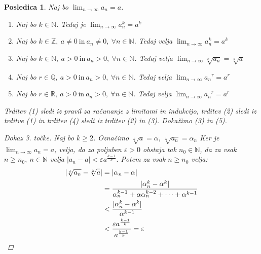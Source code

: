 \documentclass[10pt, a4paper]{article}
\newtheorem{posledica}[izr]{Posledica}
\newenvironment{noticeC}{%
  \tcolorbox[%
  notitle,
  empty,
  enhanced,  %
  breakable,
  coltext=black, 
  fontupper=\rmfamily,
  noparskip,
  sharp corners,
  boxrule=-1pt,  %
  frame hidden,
  left=7pt,  %
  right=7pt,
  top=5pt,
  bottom=5pt,
  before skip=2.5ex plus 2pt,
  after skip=2.5ex plus 2pt,
  overlay unbroken and last={%
  },
  ]}
{\endtcolorbox}
\newenvironment{dokaz}%
  {\begin{noticeC}\begin{proof}}%
  {\end{proof}\end{noticeC}}
\newcommand{\N}{\mathbb {N}}
\newcommand{\Z}{\mathbb {Z}}
\newcommand{\Q}{\mathbb {Q}}
\newcommand{\R}{\mathbb {R}}
\newcommand{\limzap}[1]{\lim_{n \to \infty} {#1}}
\begin{document}
\begin{posledica}
    Naj bo $\limzap{a_n} = a$.

    \begin{enumerate}
        \item Naj bo $k \in \N$. Tedaj je $\limzap{a_n^k} = a^k$
        \item Naj bo $k \in \Z,\ a\neq 0\ \text{in}\ a_n \neq 0,\ \forall n\in \N$. Tedaj velja $\limzap{a_n^k} = a^k$
        \item Naj bo $k \in \N,\ a > 0\ \text{in}\ a_n > 0,\ \forall n\in \N$. Tedaj velja $\limzap{\sqrt[k]{a_n}} = \sqrt[k]{a}$
        \item Naj bo $r \in \Q,\ a > 0\ \text{in}\ a_n > 0,\ \forall n\in \N$. Tedaj velja $\limzap{{a_n}^r} = a^r$
        \item Naj bo $r \in \R,\ a > 0\ \text{in}\ a_n > 0,\ \forall n\in \N$. Tedaj velja $\limzap{{a_n}^r} = a^r$
    \end{enumerate}

    Trditev (1) sledi iz pravil za računanje z limitami in indukcijo, trditev (2) sledi iz trditve (1) in trditev (4) sledi iz trditev (2) in (3).
    Dokažimo (3) in (5).

    \begin{dokaz}[Dokaz 3. točke]
        Naj bo $k \geq 2$. Označimo $\sqrt[k] {a} = \alpha,\ \sqrt[k]{a_n} = \alpha_n$ Ker je $\limzap{a_n} = a$, velja, da za poljuben $\varepsilon>0$ obstaja tak $n_0 \in \N$, da za vsak $n \geq n_0,\ n \in \N$ velja 
            $|a_n - a| < \varepsilon a^{\frac{k-1}{k}}.$ Potem za vsak $n \geq n_0$ velja:
            \begin{align*}
                |\sqrt[k] {a_n} - \sqrt[k]{a}| &= |\alpha_n - \alpha|\\
                &= \frac{|\alpha_n ^k - \alpha^k|}{\alpha_n^{k-1} + \alpha \alpha_n^{k-2} + \dots + \alpha^{k-1}}\\
                &< \frac{|\alpha_n ^k - \alpha^k|}{\alpha^{k-1}}\\
                &< \frac{\varepsilon a^{\frac{k-1}{k}}}{a^{\frac{k-1}{k}}} = \varepsilon \qedhere
            \end{align*}
        \end{dokaz}


\end{posledica}
\end{document}
